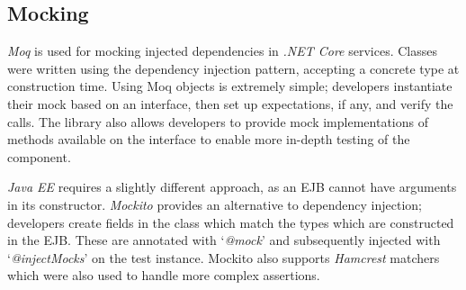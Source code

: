 \subsection{Mocking}
\par
\textit{Moq}\cite{Moq} is used for mocking injected dependencies in \textit{.NET Core} services. Classes were written using the dependency injection pattern, accepting a concrete type at construction time. Using Moq objects is extremely simple; developers instantiate their mock based on an interface, then set up expectations, if any, and verify the calls.  The library also allows developers to provide mock implementations of methods available on the interface to enable more in-depth testing of the component.

\par
\textit{Java EE} requires a slightly different approach, as an EJB cannot have arguments in its constructor. \textit{Mockito}\cite{Mockito} provides an alternative to dependency injection; developers create fields in the class which match the types which are constructed in the EJB. These are annotated with `\textit{@mock}' and subsequently injected with `\textit{@injectMocks}' on the test instance. Mockito also supports \textit{Hamcrest}\cite{Hamcrest} matchers which were also used to handle more complex assertions.
